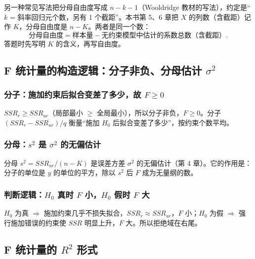 \begin{note}[自由度口径]
另一种常见写法把分母自由度写成 $n-k-1$（Wooldridge 教材的写法），约定是“$k$ = 斜率回归元个数，另有 1 个截距”。本书第 5、6 章把 $X$ 的列数（含截距）记作 $K$，分母自由度是 $n-K$。两者是同一个数：
\[
\text{分母自由度}=\text{样本量}-\text{无约束模型中估计的系数总数（含截距）}.
\]
答题时先写明 $K$ 的含义，再写自由度。
\end{note}

\subsection{F 统计量的构造逻辑：分子非负、分母估计 \texorpdfstring{$\sigma^2$}{sigma squared}}

\subsubsection{分子：施加约束后拟合变差了多少，故 \texorpdfstring{$F\ge0$}{F >= 0}}

$SSR_r\ge SSR_{ur}$（局部最小 $\ge$ 全局最小），所以分子非负，$F\ge0$。分子 $(SSR_r-SSR_{ur})/q$ 衡量“施加 $H_0$ 后拟合变差了多少”，按约束个数平均。

\subsubsection{分母：\texorpdfstring{$s^2$}{s squared} 是 \texorpdfstring{$\sigma^2$}{sigma squared} 的无偏估计}

分母 $s^2=SSR_{ur}/(n-K)$ 是误差方差 $\sigma^2$ 的无偏估计（第 4 章）。它的作用是：分子的单位是 $y$ 的单位的平方，除以 $s^2$ 后 $F$ 成为无量纲的数。

\subsubsection{判断逻辑：\texorpdfstring{$H_0$}{H0} 真时 \texorpdfstring{$F$}{F} 小，\texorpdfstring{$H_0$}{H0} 假时 \texorpdfstring{$F$}{F} 大}

$H_0$ 为真 $\Rightarrow$ 施加约束几乎不损失拟合，$SSR_r\approx SSR_{ur}$，$F$ 小；$H_0$ 为假 $\Rightarrow$ 强行施加错误的约束使 $SSR$ 明显上升，$F$ 大。所以拒绝域在右尾。

\subsection{F 统计量的 \texorpdfstring{$R^2$}{R-squared} 形式}

